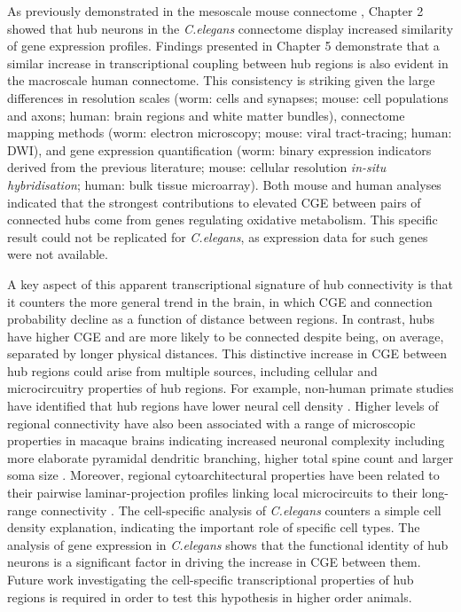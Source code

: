 As previously demonstrated in the mesoscale mouse connectome \citep{Fulcher2016}, Chapter 2 showed that hub neurons in the \textit{C.elegans} connectome display increased similarity of gene expression profiles. Findings presented in Chapter 5 demonstrate that a similar increase in transcriptional coupling between hub regions is also evident in the macroscale human connectome. This consistency is striking given the large differences in resolution scales (worm: cells and synapses; mouse: cell populations and axons; human: brain regions and white matter bundles), connectome mapping methods (worm: electron microscopy; mouse: viral tract-tracing; human: DWI), and gene expression quantification (worm: binary expression indicators derived from the previous literature; mouse: cellular resolution \textit{in-situ hybridisation}; human: bulk tissue microarray). Both mouse and human analyses indicated that the strongest contributions to elevated CGE between pairs of connected hubs come from genes regulating oxidative metabolism. This specific result could not be replicated for \textit{C.elegans}, as expression data for such genes were not available.

A key aspect of this apparent transcriptional signature of hub connectivity is that it counters the more general trend in the brain, in which CGE and connection probability decline as a function of distance between regions. In contrast, hubs have higher CGE and are more likely to be connected despite being, on average, separated by longer physical distances. This distinctive increase in CGE between hub regions could arise from multiple sources, including cellular and microcircuitry properties of hub regions. For example, non-human primate studies have identified that hub regions have lower neural cell density \citep{Beul2017,Scholtens2014}. Higher levels of regional connectivity have also been associated with a range of microscopic properties in macaque brains indicating increased neuronal complexity including more elaborate pyramidal dendritic branching, higher total spine count and larger soma size \citep{Scholtens2014}. Moreover, regional cytoarchitectural properties have been related to their pairwise laminar-projection profiles linking local microcircuits to their long-range connectivity \citep{Barbas,Barbas2015}. The cell-specific analysis of \textit{C.elegans} counters a simple cell density explanation, indicating the important role of specific cell types. The analysis of gene expression in \textit{C.elegans} shows that the functional identity of hub neurons is a significant factor in driving the increase in CGE between them. Future work investigating the cell-specific transcriptional properties of hub regions is required in order to test this hypothesis in higher order animals.

